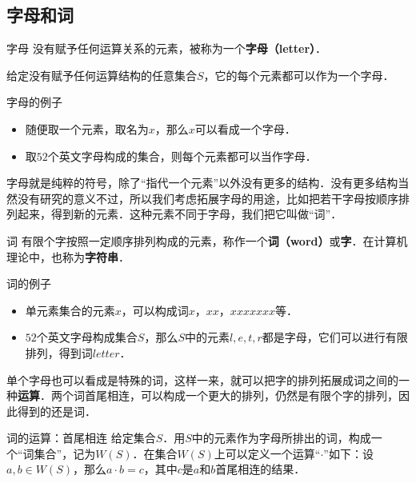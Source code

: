 

\subsection{字母和词}

\begin{definition}{字母}
没有赋予任何运算关系的元素，被称为一个\textbf{字母（letter）}．
\end{definition}

给定没有赋予任何运算结构的任意集合$S$，它的每个元素都可以作为一个字母．

\begin{example}{字母的例子}
\begin{itemize}
\item 随便取一个元素，取名为$x$，那么$x$可以看成一个字母．
\item 取$52$个英文字母构成的集合，则每个元素都可以当作字母．
\end{itemize}
\end{example}

字母就是纯粹的符号，除了“指代一个元素”以外没有更多的结构．没有更多结构当然没有研究的意义不过，所以我们考虑拓展字母的用途，比如把若干字母按顺序排列起来，得到新的元素．这种元素不同于字母，我们把它叫做“词”．

\begin{definition}{词}
有限个字按照一定顺序排列构成的元素，称作一个\textbf{词（word）}或\textbf{字}．在计算机理论中，也称为\textbf{字符串}．
\end{definition}

\begin{example}{词的例子}
\begin{itemize}
\item 单元素集合的元素$x$，可以构成词$x$，$xx$，$xxxxxxx$等．
\item $52$个英文字母构成集合$S$，那么$S$中的元素$l, e, t, r$都是字母，它们可以进行有限排列，得到词$letter$．
\end{itemize}

\end{example}

单个字母也可以看成是特殊的词，这样一来，就可以把字的排列拓展成词之间的一种\textbf{运算}．两个词首尾相连，可以构成一个更大的排列，仍然是有限个字的排列，因此得到的还是词．

\begin{definition}{词的运算：首尾相连}
给定集合$S$．用$S$中的元素作为字母所排出的词，构成一个“词集合”，记为$W(S)$．在集合$W(S)$上可以定义一个运算“$\cdot$”如下：设$a, b\in W(S)$，那么$a\cdot b=c$，其中$c$是$a$和$b$首尾相连的结果．
\end{definition}

